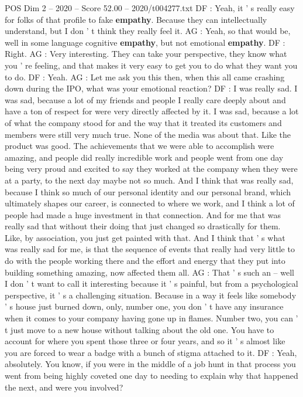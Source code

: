 \begin{textsample}{POS Dim 2 – 2020 – Score 52.00 – 2020/t004277.txt}
DF : Yeah, it ' s really easy for folks of that profile to fake \textbf{empathy}.
Because they can intellectually understand, but I don ' t think they really feel it.
AG : Yeah, so that would be, well in some language cognitive \textbf{empathy}, but not emotional \textbf{empathy}.
DF : Right.
AG : Very interesting.
They can take your perspective, they know what you ' re feeling, and that makes it very easy to get you to do what they want you to do.
DF : Yeah.
AG : Let me ask you this then, when this all came crashing down during the IPO, what was your emotional reaction?
DF : I was really sad.
I was sad, because a lot of my friends and people I really care deeply about and have a ton of respect for were very directly affected by it.
I was sad, because a lot of what the company stood for and the way that it treated its customers and members were still very much true.
None of the media was about that.
Like the product was good.
The achievements that we were able to accomplish were amazing, and people did really incredible work and people went from one day being very proud and excited to say they worked at the company when they were at a party, to the next day maybe not so much.
And I think that was really sad, because I think so much of our personal identity and our personal brand, which ultimately shapes our career, is connected to where we work, and I think a lot of people had made a huge investment in that connection.
And for me that was really sad that without their doing that just changed so drastically for them.
Like, by association, you just get painted with that.
And I think that ' s what was really sad for me, is that the sequence of events that really had very little to do with the people working there and the effort and energy that they put into building something amazing, now affected them all.
AG : That ' s such an -- well I don ' t want to call it interesting because it ' s painful, but from a psychological perspective, it ' s a challenging situation.
Because in a way it feels like somebody ' s house just burned down, only, number one, you don ' t have any insurance when it comes to your company having gone up in flames.
Number two, you can ' t just move to a new house without talking about the old one.
You have to account for where you spent those three or four years, and so it ' s almost like you are forced to wear a badge with a bunch of stigma attached to it.
DF : Yeah, absolutely.
You know, if you were in the middle of a job hunt in that process you went from being highly coveted one day to needing to explain why that happened the next, and were you involved?

\end{textsample}
